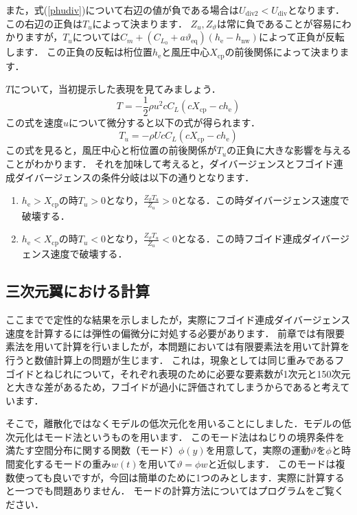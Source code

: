 \documentclass{jarticle}
\begin{document}
また，式(\ref{phudiv})について右辺の値が負である場合は$U_\mathrm{div2} < U_\mathrm{div}$となります．この右辺の正負は$T_u$によって決まります．
$Z_u,Z_\vartheta$は常に負であることが容易にわかりますが，$T_u$については$C_m +  (C_{L_0} + a\vartheta_\mathrm{eq})  (h_\mathrm{e}-h_\mathrm{nw})$によって正負が反転します．
この正負の反転は桁位置$h_\mathrm{e}$と風圧中心$X_\mathrm{cp}$の前後関係によって決まります．

$T$について，当初提示した表現を見てみましょう．
\begin{equation}
    T = -\frac{1}{2}\rho u^2 c C_L (cX_\mathrm{cp} - ch_\mathrm{e})
\end{equation}
この式を速度$u$について微分すると以下の式が得られます．
\begin{equation}
    T_u = -\rho U c C_L (cX_\mathrm{cp} - ch_\mathrm{e})
\end{equation}
この式を見ると，風圧中心と桁位置の前後関係が$T_u$の正負に大きな影響を与えることがわかります．
それを加味して考えると，ダイバージェンスとフゴイド連成ダイバージェンスの条件分岐は以下の通りとなります．
\begin{enumerate}
    \item $h_\mathrm{e} > X_\mathrm{cp}$の時$T_u>0$となり，$\frac{Z_\vartheta T_u}{Z_u} > 0$となる．この時ダイバージェンス速度で破壊する．
    \item $h_\mathrm{e} < X_\mathrm{cp}$の時$T_u<0$となり，$\frac{Z_\vartheta T_u}{Z_u} < 0$となる．この時フゴイド連成ダイバージェンス速度で破壊する．
\end{enumerate}

\subsection{三次元翼における計算}

ここまでで定性的な結果を示しましたが，実際にフゴイド連成ダイバージェンス速度を計算するには弾性の偏微分に対処する必要があります．
前章では有限要素法を用いて計算を行いましたが，本問題においては有限要素法を用いて計算を行うと数値計算上の問題が生じます．
これは，現象としては同じ重みであるフゴイドとねじれについて，それぞれ表現のために必要な要素数が1次元と150次元と大きな差があるため，フゴイドが過小に評価されてしまうからであると考えています．

そこで，離散化ではなくモデルの低次元化を用いることにしました．モデルの低次元化はモード法というものを用います．
このモード法はねじりの境界条件を満たす空間分布に関する関数（モード）$\phi(y)$を用意して，実際の運動$\vartheta$を$\phi$と時間変化するモードの重み$w(t)$を用いて$\vartheta=\phi w$と近似します．
このモードは複数使っても良いですが，今回は簡単のために1つのみとします．実際に計算すると一つでも問題ありません．
モードの計算方法についてはプログラムをご覧ください．
\end{document}

